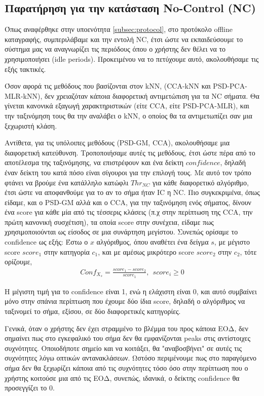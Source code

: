 \documentclass[11pt,a4paper,english,greek,twoside]{../Thesis}
\begin{document}
\subsection{Παρατήρηση για την κατάσταση No-Control (NC)}
\label{subsec:NC}
\par Όπως αναφέρθηκε στην υποενότητα \ref{subsec:protocol}, στο προτόκολο offline καταγραφής, συμπεριλάβαμε και την εντολή NC, έτσι ώστε να εκπαιδεύσουμε το σύστημα μας να αναγνωρίζει τις περιόδους όπου ο χρήστης δεν θέλει να το χρησιμοποιήσει (idle periods). Προκειμένου να το πετύχουμε αυτό, ακολουθήσαμε τις εξής τακτικές. 

\par Όσον αφορά τις μεθόδους που βασίζονται στον kNN, (CCA-kNN και PSD-PCA-MLR-kNN), δεν χρειαζόταν κάποια διαφορετική αντιμετώπιση για τα NC σήματα. Θα γίνεται κανονικά εξαγωγή χαρακτηριστικών (είτε CCA, είτε PSD-PCA-MLR), και την ταξινόμηση τους θα την αναλάβει ο kNN, ο οποίος θα τα αντιμετωπίζει σαν μια ξεχωριστή κλάση.

\par Αντίθετα, για τις υπόλοιπες μεθόδους (PSD-GM, CCA), ακολουθήσαμε μια διαφορετική κατεύθυνση. Τροποποιήσαμε αυτές τις μεθόδους, έτσι ώστε πέρα από το αποτέλεσμα της ταξινόμησης, να επιστρέφουν και ένα δείκτη $confidence$, δηλαδή έναν δείκτη του κατά πόσο είναι σίγουροι για την επιλογή τους. Με αυτό τον τρόπο φτάνει να βρούμε ένα κατάλληλο κατώφλι $Thr_{NC}$ για κάθε διαφορετικό αλγόριθμο, έτσι ώστε να αποφανθούμε για το αν το σήμα ήταν IC η NC. Πιο συγκεκριμένα, όπως είδαμε, και ο PSD-GM αλλά και ο CCA, για την ταξινόμηση ενός σήματος, δίνουν ένα score για κάθε μία από τις τέσσερις κλάσεις (π.χ στην περίπτωση της CCA, την πρώτη κανονική συσχέτιση), τα οποία score στην συνέχεια, είδαμε πως χρησιμοποιούνται ως είσοδος  σε μια συνάρτηση μεγίστου. Συνεπώς ορίσαμε το confidence ως εξής: Έστω ο $x$ αλγόριθμος, όπου αναθέτει ένα δείγμα $s$, με μέγιστο score $score_1$ στην κατηγορία $c_1$, και με αμέσως μικρότερο score $score_2$ στην $c_2$, τότε ορίζουμε,
\begin{align}
    Conf_{X_s} = \frac{score_1 - score_2}{score_1}, \ \ score_i\geqslant 0
\end{align}

Η μέγιστη τιμή για το confidence είναι 1, ενώ η ελάχιστη είναι 0, και αυτό συμβαίνει μόνο στην σπάνια περίπτωση που έχουμε δύο ίδια score, δηλαδή ο αλγόριθμος να ταξινομεί το σήμα, εξίσου, σε δύο διαφορετικές κατηγορίες. 
\par Γενικά, όταν ο χρήστης δεν έχει στραμμένο το βλέμμα του προς κάποια ΕΟΔ, δεν σημαίνει πως στο εγκεφαλικό του σήμα δεν θα εμφανίζονται peaks στις αντίστοιχες συχνότητες. Οποιοδήποτε σημείο και να κοιτάξει, θα "αναβοσβήνει" σε αυτές τις συχνότητες λόγω οπτικών αντανακλάσεων. Ωστόσο περιμένουμε πως στο παραγόμενο σήμα δεν θα ξεχωρίζει κάποια από τις συχνότητες τόσο όσο στην περίπτωση που ο χρήστης κοιτούσε μια από τις ΕΟΔ, συνεπώς, ιδανικά, ο δείκτης confidence θα προσεγγίζει το 0.
\end{document}
